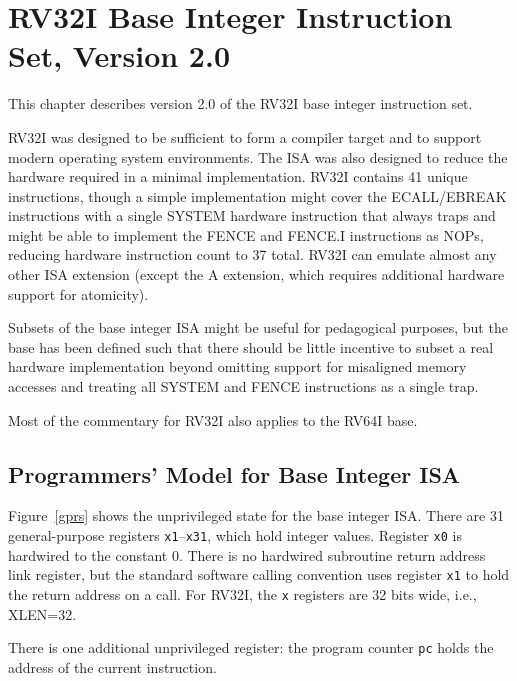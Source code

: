 \chapter{RV32I Base Integer Instruction Set, Version 2.0}
\label{rv32}

This chapter describes version 2.0 of the RV32I base integer
instruction set.

\begin{commentary}
RV32I was designed to be sufficient to form a compiler target and to
support modern operating system environments.  The ISA was also
designed to reduce the hardware required in a minimal implementation.
RV32I contains 41 unique instructions, though a simple implementation
might cover the ECALL/EBREAK instructions with a single
SYSTEM hardware instruction that always traps and might be able to
implement the FENCE and FENCE.I instructions as NOPs, reducing
hardware instruction count to 37 total.  RV32I can emulate almost any
other ISA extension (except the A extension, which requires additional
hardware support for atomicity).

Subsets of the base integer ISA might be useful for pedagogical
purposes, but the base has been defined such that there should be
little incentive to subset a real hardware implementation beyond
omitting support for misaligned memory accesses and treating all
SYSTEM and FENCE instructions as a single trap.
\end{commentary}

\begin{commentary}
Most of the commentary for RV32I also applies to the RV64I base.
\end{commentary}

\section{Programmers' Model for Base Integer ISA}

Figure~\ref{gprs} shows the unprivileged state for the base integer
ISA.  There are 31 general-purpose registers {\tt x1}--{\tt x31},
which hold integer values.  Register {\tt x0} is hardwired to the
constant 0.  There is no hardwired subroutine return address link
register, but the standard software calling convention uses register
{\tt x1} to hold the return address on a call.  For RV32I, the {\tt x}
registers are 32 bits wide, i.e., XLEN=32.

There is one additional unprivileged register: the program counter {\tt pc}
holds the address of the current instruction.

